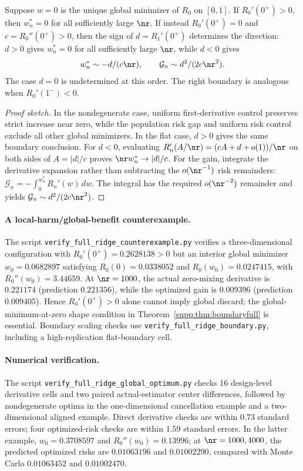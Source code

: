 \begin{theorem}\label{supp:thm:boundaryfull}
Suppose $w=0$ is the unique global minimizer of $R_0$ on $[0,1]$. If $R_0'(0^+)>0$, then $w_n^*=0$ for all sufficiently large $\nr$. If instead $R_0'(0^+)=0$ and $c=R_0''(0^+)>0$, then the sign of $d=R_1'(0^+)$ determines the direction: $d>0$ gives $w_n^*=0$ for all sufficiently large $\nr$, while $d<0$ gives
\begin{equation}
 w_n^*\sim-d/(c\nr),\qquad \mathcal G_n\sim d^2/(2c\nr^2).
\end{equation}
The case $d=0$ is undetermined at this order. The right boundary is analogous when $R_0'(1^-)<0$.
\end{theorem}

\begin{proof}[Proof sketch]
In the nondegenerate case, uniform first-derivative control preserves strict increase near zero, while the population risk gap and uniform risk control exclude all other global minimizers. In the flat case, $d>0$ gives the same boundary conclusion. For $d<0$, evaluating $R_n'(A/\nr)=(cA+d+o(1))/\nr$ on both sides of $A=|d|/c$ proves $\nr w_n^*\to|d|/c$. For the gain, integrate the derivative expansion rather than subtracting the $o(\nr^{-1})$ risk remainders:
$\mathcal G_n=-\int_0^{w_n^*}R_n'(w)\,dw$. The integral has the required $o(\nr^{-2})$ remainder and yields $\mathcal G_n\sim d^2/(2c\nr^2)$.
\end{proof}

\paragraph{A local-harm/global-benefit counterexample.}
The script \texttt{verify\_full\_ridge\_counterexample.py} verifies a three-dimensional configuration with $R_0'(0^+)=0.2628138>0$ but an interior global minimizer $w_0=0.0682897$ satisfying $R_0(0)=0.0338052$ and $R_0(w_0)=0.0247415$, with $R_0''(w_0)=3.44659$. At $\nr=1000$, the actual zero-mixing derivative is $0.221174$ (prediction $0.221356$), while the optimized gain is $0.009396$ (prediction $0.009405$). Hence $R_0'(0^+)>0$ alone cannot imply global discard; the global-minimum-at-zero shape condition in Theorem~\ref{supp:thm:boundaryfull} is essential. Boundary scaling checks use \texttt{verify\_full\_ridge\_boundary.py}, including a high-replication flat-boundary cell.

\paragraph{Numerical verification.}
The script \texttt{verify\_full\_ridge\_global\_optimum.py} checks 16 design-level derivative cells and two paired actual-estimator center differences, followed by nondegenerate optima in the one-dimensional cancellation example and a two-dimensional aligned example. Direct derivative checks are within $0.73$ standard errors; four optimized-risk checks are within $1.59$ standard errors. In the latter example, $w_0=0.3708597$ and $R_0''(w_0)=0.13996$; at $\nr=1000,4000$, the predicted optimized risks are $0.01063196$ and $0.01002290$, compared with Monte Carlo $0.01063452$ and $0.01002470$.

